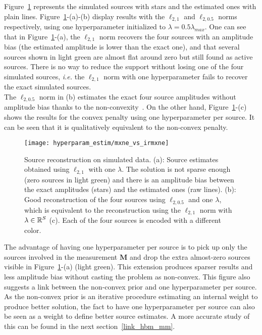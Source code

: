 Figure~\ref{fig:mxne_vs_irmxne} represents the simulated sources with stars and the estimated ones with plain lines. Figure~\ref{fig:mxne_vs_irmxne}-(a)-(b) display results with the $\ell_{2,1}$ and $\ell_{2,0.5}$ norms respectively, using one hyperparameter initialized to $\lambda=0.5\lambda_{max}$. One can see that in Figure~\ref{fig:mxne_vs_irmxne}-(a), the $\ell_{2,1}$ norm recovers the four sources with an amplitude bias (the estimated amplitude is lower than the exact one), and that several sources shown in light green are almost flat around zero but still found as active sources. There is no way to reduce the support without losing one of the four simulated sources, \textit{i.e.} the $\ell_{2,1}$ norm with one hyperparameter fails to recover the exact simulated sources.\\
The $\ell_{2,0.5}$ norm in (b) estimates the exact four source amplitudes without amplitude bias thanks to the non-convexity~\cite{strohmeier-etal:16}. On the other hand, Figure~\ref{fig:mxne_vs_irmxne}-(c) shows the results for the convex penalty using one hyperparameter per source. It can be seen that it is qualitatively equivalent to the non-convex penalty. \\

\begin{figure}
	\texttt{[image: hyperparam\_estim/mxne\_vs\_irmxne]}
    \caption{Source reconstruction on simulated data. (a): Source estimates obtained using $\ell_{2,1}$ with one $\lambda$. The solution is not sparse enough (zero sources in light green) and there is an amplitude bias between the exact amplitudes (stars) and the estimated ones (raw lines). (b): Good reconstruction of the four sources using $\ell_{2,0.5}$ and one $\lambda$, which is equivalent to the reconstruction using the $\ell_{2,1}$ norm with $\lambda\in\mathbb{R}^S$ (c). Each of the four sources is encoded with a different color.
    }
    \label{fig:mxne_vs_irmxne}
\end{figure}

The advantage of having one hyperparameter per source is to pick up only the sources involved in the measurement $\mathbf{M}$ and drop the extra almost-zero sources visible in Figure~\ref{fig:mxne_vs_irmxne}-(a) (light green). This extension produces sparser results and less amplitude bias without casting the problem as non-convex. This figure also suggests a link between the non-convex prior and one hyperparameter per source. As the non-convex prior is an iterative procedure estimating an internal weight to produce better solution, the fact to have one hyperparameter per source can also be seen as a weight to define better source estimates. A more accurate study of this can be found in the next section~\ref{link_hbm_mm}.


